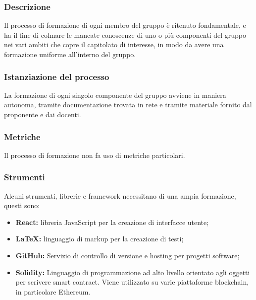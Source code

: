\subsubsection {Descrizione}
Il processo di formazione di ogni membro del gruppo \groupName{} è ritenuto fondamentale, e ha il fine di colmare le mancate conoscenze di uno o più componenti del gruppo nei vari ambiti che copre il capitolato di interesse, in modo da avere una formazione uniforme all'interno del gruppo.
\subsubsection{Istanziazione del processo}
La formazione di ogni singolo componente del gruppo avviene in maniera autonoma, tramite documentazione trovata in rete e tramite materiale fornito dal proponente e dai docenti.

\subsubsection{Metriche}
Il processo di formazione non fa uso di metriche particolari.
\subsubsection{Strumenti}
Alcuni strumenti, librerie e framework necessitano di una ampia formazione, questi sono: 

\begin{itemize}
  \item \textbf{React:} libreria JavaScript\glo{} per la creazione di interfacce utente;
  \item \textbf{\LaTeX:} linguaggio di markup per la creazione di testi;
  \item \textbf{GitHub:} Servizio di controllo di versione e hosting per progetti software;
  \item \textbf{Solidity:} Linguaggio di programmazione ad alto livello orientato agli oggetti per scrivere smart contract\glo{}.
  Viene utilizzato su varie piattaforme blockchain\glo{}, in particolare Ethereum\glo{}.

\end{itemize} 